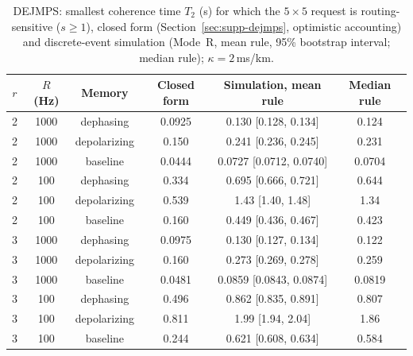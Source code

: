 \begin{table}[!t]
\centering
\caption{DEJMPS: smallest coherence time $T_2$ (s) for which the $5\times5$ request is routing-sensitive ($s\ge1$), closed form (Section~\ref{sec:supp-dejmps}, optimistic accounting) and discrete-event simulation (Mode~R, mean rule, 95\% bootstrap interval; median rule); $\kappa=2$\,ms/km.}
\label{tab:desdejmps}
\scriptsize
\setlength{\tabcolsep}{2.5pt}
\begin{tabular}{@{}cccccc@{}}
\toprule
$r$ & $R$ (Hz) & Memory & Closed form & Simulation, mean rule & Median rule \\
\midrule
2 & 1000 & dephasing & 0.0925 & 0.130 [0.128, 0.134] & 0.124\\
2 & 1000 & depolarizing & 0.150 & 0.241 [0.236, 0.245] & 0.231\\
2 & 1000 & baseline & 0.0444 & 0.0727 [0.0712, 0.0740] & 0.0704\\
2 & 100 & dephasing & 0.334 & 0.695 [0.666, 0.721] & 0.644\\
2 & 100 & depolarizing & 0.539 & 1.43 [1.40, 1.48] & 1.34\\
2 & 100 & baseline & 0.160 & 0.449 [0.436, 0.467] & 0.423\\
3 & 1000 & dephasing & 0.0975 & 0.130 [0.127, 0.134] & 0.122\\
3 & 1000 & depolarizing & 0.160 & 0.273 [0.269, 0.278] & 0.259\\
3 & 1000 & baseline & 0.0481 & 0.0859 [0.0843, 0.0874] & 0.0819\\
3 & 100 & dephasing & 0.496 & 0.862 [0.835, 0.891] & 0.807\\
3 & 100 & depolarizing & 0.811 & 1.99 [1.94, 2.04] & 1.86\\
3 & 100 & baseline & 0.244 & 0.621 [0.608, 0.634] & 0.584\\
\bottomrule
\end{tabular}
\end{table}
